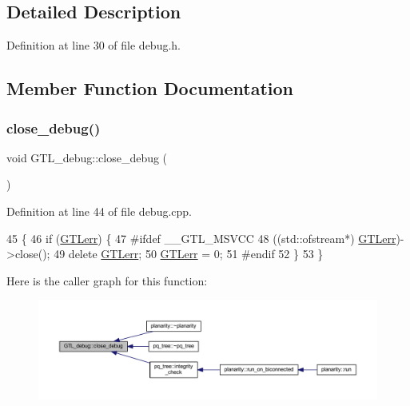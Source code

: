 \subsection{Detailed Description}


Definition at line 30 of file debug.\+h.



\subsection{Member Function Documentation}
\mbox{\label{class_g_t_l__debug_a18b39d8b303a59062f86702a01ab6a98}} 
\subsubsection{\texorpdfstring{close\+\_\+debug()}{close\_debug()}}
{\footnotesize\ttfamily void G\+T\+L\+\_\+debug\+::close\+\_\+debug (\begin{DoxyParamCaption}{ }\end{DoxyParamCaption})\hspace{0.3cm}{\ttfamily [static]}}



Definition at line 44 of file debug.\+cpp.


\begin{DoxyCode}
45 \{
46     \textcolor{keywordflow}{if} (\mbox{\hyperlink{class_g_t_l__debug_a342e76e2d4f128a29548aae14172db45}{GTLerr}}) \{
47 \textcolor{preprocessor}{#ifdef \_\_GTL\_MSVCC }
48         ((std::ofstream*) \mbox{\hyperlink{class_g_t_l__debug_a342e76e2d4f128a29548aae14172db45}{GTLerr}})->close();
49     \textcolor{keyword}{delete} \mbox{\hyperlink{class_g_t_l__debug_a342e76e2d4f128a29548aae14172db45}{GTLerr}};
50     \mbox{\hyperlink{class_g_t_l__debug_a342e76e2d4f128a29548aae14172db45}{GTLerr}} = 0;
51 \textcolor{preprocessor}{#endif}
52     \}
53 \}
\end{DoxyCode}
Here is the caller graph for this function\+:\nopagebreak
\begin{figure}[H]
\begin{center}
\leavevmode
\includegraphics[width=350pt]{class_g_t_l__debug_a18b39d8b303a59062f86702a01ab6a98_icgraph}
\end{center}
\end{figure}
\mbox{\label{class_g_t_l__debug_aca4c2fb24203b5fba5e4ffa9c2fa263f}} 
